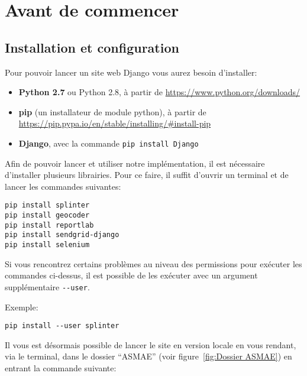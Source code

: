 \chapter{Avant de commencer}

\section{Installation et configuration}
\label{sec:Installation et configuration}

Pour pouvoir lancer un site web Django vous aurez besoin d'installer: \newline

\begin{itemize}
    \item \textbf{Python 2.7} ou Python 2.8, à partir de
    \url{https://www.python.org/downloads/}
    \item \textbf{pip} (un installateur de module python), à partir de
    \url{https://pip.pypa.io/en/stable/installing/#install-pip}
    \item \textbf{Django}, avec la commande \verb#pip install Django#
\end{itemize}

Afin de pouvoir lancer et utiliser notre implémentation, il est nécessaire
d’installer plusieurs librairies. Pour ce faire, il suffit d’ouvrir un terminal
et de lancer les commandes suivantes: \newline

\begin{verbatim}
pip install splinter
pip install geocoder
pip install reportlab
pip install sendgrid-django
pip install selenium
\end{verbatim}

Si vous rencontrez certains problèmes au niveau des permissions pour exécuter
les commandes ci-dessus, il est possible de les exécuter avec un argument
supplémentaire \verb#--user#. \newline

\begin{framed}
Exemple: \newline

\verb#pip install --user splinter#
\end{framed}

Il vous est désormais possible de lancer le site en version locale en vous
rendant, via le terminal, dans le dossier \enquote{ASMAE} (voir
figure~\ref{fig:Dossier ASMAE}) en entrant la commande suivante: \newline

